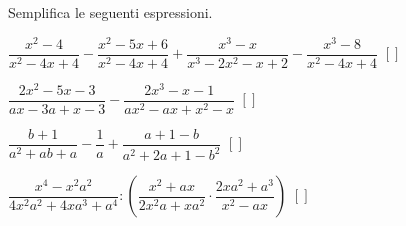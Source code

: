 \begin{esercizio}
Semplifica le seguenti espressioni.
\begin{enumeratea}
 \item $\dfrac{x^{2}-4}{x^{2}-4x+4}-\dfrac{x^{2}-5x+6}{x^{2}-4x+4}+
        \dfrac{x^{3}-x}{x^{3}-2x^{2}-x+2}-\dfrac{x^{3}-8}{x^{2}-4x+4}$
  \hfill $\left[\right]$
 \item $\dfrac{2x^{2}-5x-3}{ax-3a+x-3}-\dfrac{2x^{3}-x-1}{ax^{2}-ax+x^{2}-x}$
  \hfill $\left[\right]$
 \item $\dfrac{b+1}{a^{2}+ab+a}-\dfrac{1}{a}+\dfrac{a+1-b}{a^{2}+2a+1-b^{2}}$
  \hfill $\left[\right]$
 \item $\dfrac{x^{4}-x^{2}a^{2}}{4x^{2}a^{2}+4xa^{3}+a^{4}}:
        \left(\dfrac{x^{2}+ax}{2x^{2}a+xa^{2}}\cdot
             {\dfrac{2xa^{2}+a^{3}}{x^{2}-ax}}\right)$
  \hfill $\left[\right]$
\end{enumeratea}
\end{esercizio}

